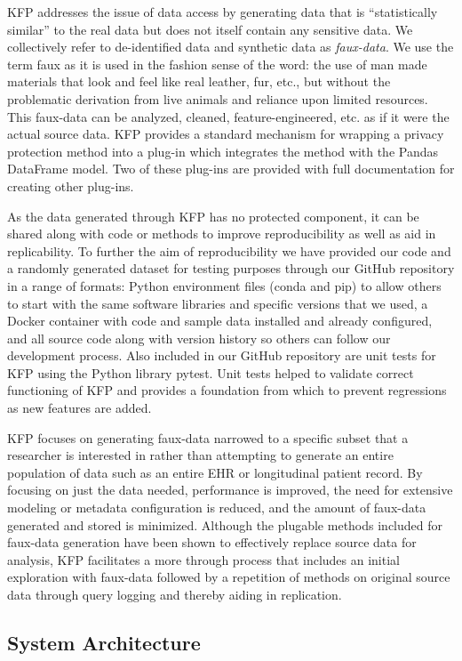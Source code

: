 \documentclass{amia}
\begin{document}
KFP addresses the issue of data access by generating data that is ``statistically similar'' to the real data but does not itself contain any sensitive data. We collectively refer to de-identified data and synthetic data as \emph{faux-data}. We use the term faux as it is used in the fashion sense of the word: the use of man made materials that look and feel like real leather, fur, etc., but without the problematic derivation from live animals and reliance upon limited resources. This faux-data can be analyzed, cleaned, feature-engineered, etc. as if it were the actual source data. KFP provides a standard mechanism for wrapping a privacy protection method into a plug-in which integrates the method with the Pandas DataFrame model. Two of these plug-ins are provided with full documentation for creating other plug-ins.

As the data generated through KFP has no protected component, it can be shared along with code or methods to improve reproducibility as well as aid in replicability. To further the aim of reproducibility we have provided our code and a randomly generated dataset for testing purposes through our GitHub repository in a range of formats: Python environment files (conda and pip) to allow others to start with the same software libraries and specific versions that we used, a Docker container with code and sample data installed and already configured, and all source code along with version history so others can follow our development process. Also included in our GitHub repository are unit tests for KFP using the Python library pytest. Unit tests helped to validate correct functioning of KFP and provides a foundation from which to prevent regressions as new features are added. 

KFP focuses on generating faux-data narrowed to a specific subset that a researcher is interested in rather than attempting to generate an entire population of data such as an entire EHR or longitudinal patient record. By focusing on just the data needed, performance is improved, the need for extensive modeling or metadata configuration is reduced, and the amount of faux-data generated and stored is minimized. Although the plugable methods included for faux-data generation have been shown to effectively replace source data for analysis, KFP facilitates a more through process that includes an initial exploration with faux-data followed by a repetition of methods on original source data through query logging and thereby aiding in replication.

\subsection{System Architecture}
\end{document}
